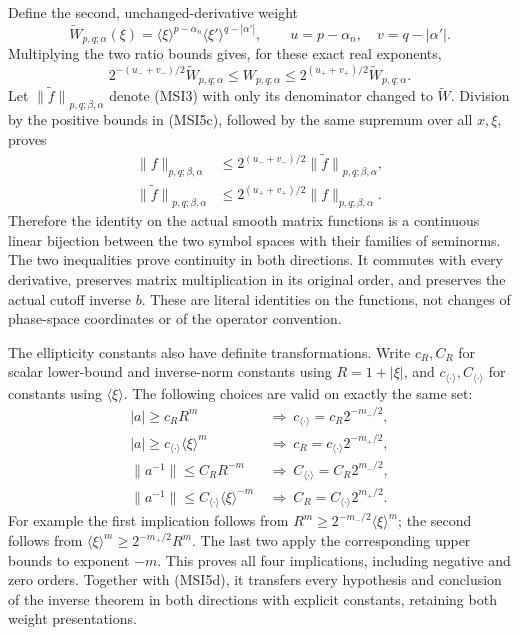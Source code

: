 \documentclass[
  11pt,
]{article}
\begin{document}
Define the second, unchanged-derivative weight \[
 \widetilde W_{p,q;\alpha}(\xi)
 =\langle\xi\rangle^{p-\alpha_n}
  \langle\xi'\rangle^{q-|\alpha'|},
 \qquad u=p-\alpha_n,\quad v=q-|\alpha'|.
 \tag{MSI5b}
\] Multiplying the two ratio bounds gives, for these exact real
exponents, \[
 2^{-(u_-+v_-)/2}\widetilde W_{p,q;\alpha}
 \leq W_{p,q;\alpha}
 \leq2^{(u_++v_+)/2}\widetilde W_{p,q;\alpha}.
 \tag{MSI5c}
\] Let \(\widetilde{\|f\|}_{p,q;\beta,\alpha}\) denote (MSI3) with only
its denominator changed to \(\widetilde W\). Division by the positive
bounds in (MSI5c), followed by the same supremum over all \(x,\xi\),
proves \[
\begin{aligned}
 \|f\|_{p,q;\beta,\alpha}
 &\leq2^{(u_-+v_-)/2}\widetilde{\|f\|}_{p,q;\beta,\alpha},\\
 \widetilde{\|f\|}_{p,q;\beta,\alpha}
 &\leq2^{(u_++v_+)/2}\|f\|_{p,q;\beta,\alpha}.
\end{aligned}
 \tag{MSI5d}
\] Therefore the identity on the actual smooth matrix functions is a
continuous linear bijection between the two symbol spaces with their
families of seminorms. The two inequalities prove continuity in both
directions. It commutes with every derivative, preserves matrix
multiplication in its original order, and preserves the actual cutoff
inverse \(b\). These are literal identities on the functions, not
changes of phase-space coordinates or of the operator convention.

The ellipticity constants also have definite transformations. Write
\(c_R,C_R\) for scalar lower-bound and inverse-norm constants using
\(R=1+|\xi|\), and \(c_{\langle\cdot\rangle},C_{\langle\cdot\rangle}\)
for constants using \(\langle\xi\rangle\). The following choices are
valid on exactly the same set: \[
\begin{aligned}
 |a|\geq c_R R^m
   &\ \Longrightarrow\ c_{\langle\cdot\rangle}=c_R2^{-m_-/2},\\
 |a|\geq c_{\langle\cdot\rangle}\langle\xi\rangle^m
   &\ \Longrightarrow\ c_R=c_{\langle\cdot\rangle}2^{-m_+/2},\\
 \|a^{-1}\|\leq C_R R^{-m}
   &\ \Longrightarrow\ C_{\langle\cdot\rangle}=C_R2^{m_-/2},\\
 \|a^{-1}\|\leq C_{\langle\cdot\rangle}\langle\xi\rangle^{-m}
   &\ \Longrightarrow\ C_R=C_{\langle\cdot\rangle}2^{m_+/2}.
\end{aligned}
 \tag{MSI5e}
\] For example the first implication follows from
\(R^m\geq2^{-m_-/2}\langle\xi\rangle^m\); the second follows from
\(\langle\xi\rangle^m\geq2^{-m_+/2}R^m\). The last two apply the
corresponding upper bounds to exponent \(-m\). This proves all four
implications, including negative and zero orders. Together with (MSI5d),
it transfers every hypothesis and conclusion of the inverse theorem in
both directions with explicit constants, retaining both weight
presentations.
\end{document}
